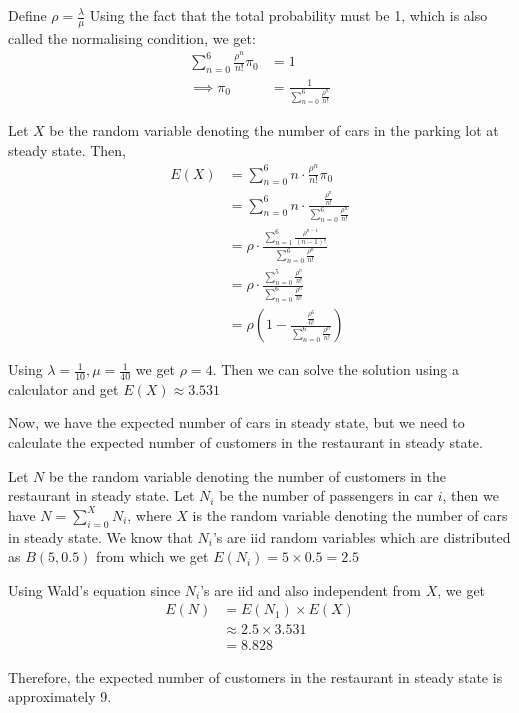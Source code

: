 \documentclass[12pt, oneside]{article}
\begin{document}
\begin{enumerate}
{    Define \(\rho = \frac{\lambda}{\mu}\)
    Using the fact that  the total probability must be 1, which is also called the
    normalising condition, we get:
    \begin{align*}
        \sum_{n = 0}^{6} \frac{\rho^n}{n!} \pi_0 &= 1 \\
        \implies \pi_0 &= \frac{1}{\sum_{n = 0}^{6} \frac{\rho^n}{n!}}
    \end{align*}

    Let \(X\) be the random variable denoting the number of cars in the parking lot
    at steady state. Then,
    \begin{align*}
        E(X) &= \sum_{n = 0}^{6} n \cdot \frac{\rho^n}{n!} \pi_0 \\
             &= \sum_{n = 0}^{6} n \cdot \frac{\frac{\rho^n}{n!}}{\sum_{n = 0}^{6} \frac{\rho^n}{n!}} \\
             &= \rho \cdot \frac{\sum_{n=1}^{6} \frac{\rho^{n-1}}{(n-1)!}}{\sum_{n = 0}^{6} \frac{\rho^n}{n!}} \\
             &= \rho \cdot \frac{\sum_{n=0}^{5} \frac{\rho^{n}}{n!}}{\sum_{n = 0}^{6} \frac{\rho^n}{n!}} \\
             &= \rho \left(1 - \frac{\frac{\rho^6}{6!}}
                                    {\sum_{n = 0}^{6} \frac{\rho^n}{n!}}\right)        
    \end{align*}

    Using \(\lambda = \frac{1}{10}, \mu = \frac{1}{40}\) we get \(\rho = 4\). Then we can
    solve the solution using a calculator and get \(E(X) \approx 3.531\)

    Now, we have the expected number of cars in steady state, but we need to calculate the
    expected number of customers in the restaurant in steady state.

    Let \(N\) be the random variable denoting the number of customers in the restaurant in
    steady state. Let \(N_i\) be the number of passengers in car \(i\), then we have 
    \(N = \sum_{i = 0}^{X} N_i\), where \(X\) is the random variable denoting the number of cars
    in steady state. We know that \(N_i\)'s are iid random variables which 
    are distributed as \(B(5, 0.5)\) from which we get \(E(N_i) = 5 \times 0.5 = 2.5\)

    Using Wald's equation since \(N_i\)'s are iid and also independent from \(X\), we get
    \begin{align*}
        E(N) &= E(N_1) \times E(X) \\
             &\approx 2.5 \times 3.531 \\
             &= 8.828
    \end{align*}

    Therefore, the expected number of customers in the restaurant in steady state is
    approximately 9.
}

\end{enumerate}
\end{document}
